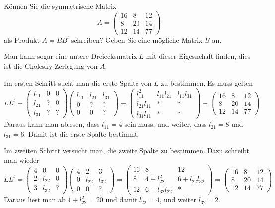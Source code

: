 Können Sie die symmetrische Matrix
\[
A=\begin{pmatrix}
16& 8&12\\
 8&20&14\\
12&14&77
\end{pmatrix}
\]
als Produkt $A=BB^t$ schreiben? Geben Sie eine mögliche Matrix $B$ an.

\begin{loesung}
Man kann sogar eine untere Dreiecksmatrix $L$ mit dieser Eigesnchaft finden,
dies ist die Cholesky-Zerlegung von $A$.

Im ersten Schritt sucht man die erste Spalte von $L$ zu bestimmen.
Es muss gelten
\[
LL^t=
\begin{pmatrix}
l_{11}&  0&  0\\
l_{21}&  ?&  0\\
l_{31}&  ?&  ?
\end{pmatrix}
\begin{pmatrix}
l_{11}&l_{21}&l_{31}\\
     0&     ?&     ?\\
     0&     0&     ?
\end{pmatrix}
=
\begin{pmatrix}
    l_{11}^2&l_{11}l_{21}&l_{11}l_{31}\\
l_{21}l_{11}&           *&           *\\
l_{31}l_{11}&           *&           *
\end{pmatrix}
=
\begin{pmatrix}
16& 8& 12\\
 8&20& 14\\
12&14& 77
\end{pmatrix}
\]
Daraus kann man ablesen, dass $l_{11}=4$ sein muss, und weiter,
dass
$l_{21}=8$ und $l_{31}=6$. Damit ist die erste Spalte bestimmt.

Im zweiten Schritt versucht man, die zweite Spalte zu bestimmen.
Dazu schreibt man wieder
\[
LL^t
=
\begin{pmatrix}
4&     0&0\\
2&l_{22}&0\\
3&l_{32}&?
\end{pmatrix}
\begin{pmatrix}
4&     2&     3\\
0&l_{22}&l_{32}\\
0&     0&?
\end{pmatrix}
=
\begin{pmatrix}
16&              8&            12\\
 8& 4+l_{22}^2    &6+l_{22}l_{32}\\
12& 6+l_{32}l_{22}&             *
\end{pmatrix}
=
\begin{pmatrix}
16& 8& 12\\
 8&20& 14\\
12&14& 77
\end{pmatrix}
\]
Daraus liest man ab $4+l_{22}^2=20$ und damit $l_{22}=4$, und weiter
$l_{32}=2$.


\end{loesung}
